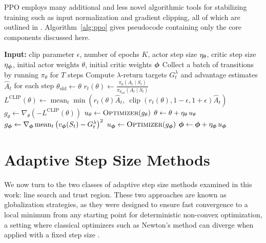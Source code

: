   PPO employs many additional and less novel algorithmic tools for stabilizing training such as input normalization and gradient clipping, all of which are outlined in . Algorithm~\ref{alg:ppo} gives pseudocode containing only the core components discussed here.
  
  \begin{algorithm}[t]
  \caption{Proximal Policy Optimization (PPO)}
  \label{alg:ppo}
  \begin{algorithmic}[1]
  \State \textbf{Input:} clip parameter $\epsilon$, number of epochs $K$, actor step size $\eta_\theta$, critic step size $\eta_{{\bm \phi}}$, initial actor weights $\theta$, initial critic weights ${\bm \phi}$
      \State Collect a batch of transitions by running $\pi_\theta$ for $T$ steps
      \State Compute $\lambda$-return targets $G_t^\lambda$ and advantage estimates $\hat{A}_t$ for each step
      \State $\theta_{\text{old}} \gets \theta$
              \State $r_t(\theta) \gets \frac{\pi_\theta(A_t \mid S_t)}{\pi_{\theta_{\text{old}}}(A_t \mid S_t)}$
              \State $L^{\text{CLIP}}(\theta) \gets \operatorname{mean}_t \min\!\left( r_t(\theta) \hat{A}_t,\ \operatorname{clip}(r_t(\theta), 1-\epsilon, 1+\epsilon)\hat{A}_t \right)$
              \State $g_\theta \gets \nabla_\theta \left( -L^{\text{CLIP}}(\theta) \right)$ 
              \State $\update_\theta \gets \textproc{Optimizer}(g_\theta)$ 
              \State $\theta \gets \theta + \eta_\theta\, u_\theta$
              \State $g_{{\bm \phi}} \gets \nabla_{{\bm \phi}} \operatorname{mean}_t \left( v_{\bm \phi}(S_t) - G_t^\lambda \right)^2$ 
              \State $\update_{\vparams} \gets \textproc{Optimizer}(g_{\vparams})$
              \State ${\bm \phi} \gets {\bm \phi} + \eta_{{\bm \phi}}\, u_{{\bm \phi}}$
          \EndFor
      \EndFor
  \EndFor
  \end{algorithmic}
  \end{algorithm}
  
  
  \section{Adaptive Step Size Methods} \label{sec:adaptive}
  We now turn to the two classes of adaptive step size methods examined in this work: line search and trust region. These two approaches are known as globalization strategies, as they were designed to ensure fast convergence to a local minimum from any starting point for deterministic non-convex optimization, a setting where classical optimizers such as Newton's method can diverge when applied with a fixed step size . 
  
